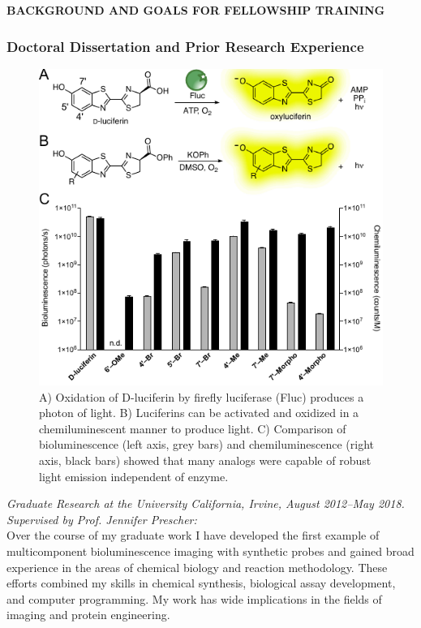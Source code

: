 \documentclass[11pt]{article}
\title{ }
\begin{document}
\begin{centering}
  \textbf{BACKGROUND AND GOALS FOR FELLOWSHIP TRAINING}\\
\end{centering}
\subsubsection*{Doctoral Dissertation and Prior Research Experience}
\begin{figure}
\begin{centering}
\includegraphics[width=\textwidth]{figures/chemilum.pdf}

\end{centering}
\footnotesize
\caption{\label{figure:chemilum}
A) Oxidation of D-luciferin by firefly luciferase (Fluc) produces a photon of light. B) Luciferins can be activated and oxidized in a chemiluminescent manner to produce light. C) Comparison of bioluminescence (left axis, grey bars) and chemiluminescence (right axis, black bars) showed that many analogs were capable of robust light emission independent of enzyme.}
\end{figure}
\textit{Graduate Research at the University California, Irvine, August 2012--May 2018. Supervised by Prof. Jennifer Prescher:}\\
Over the course of my graduate work I have developed the first example of multicomponent bioluminescence imaging with synthetic probes and gained broad experience in the areas of chemical biology and reaction methodology. These efforts combined my skills in chemical synthesis, biological assay development, and computer programming. My work has wide implications in the fields of imaging and protein engineering.
\end{document}
